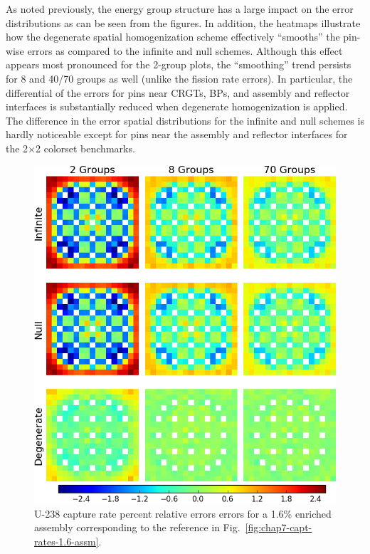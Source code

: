 As noted previously, the energy group structure has a large impact on the error distributions as can be seen from the figures. In addition, the heatmaps illustrate how the degenerate spatial homogenization scheme effectively ``smooths'' the pin-wise errors as compared to the infinite and null schemes. Although this effect appears most pronounced for the 2-group plots, the ``smoothing'' trend persists for 8 and 40/70 groups as well (unlike the fission rate errors). In particular, the differential of the errors for pins near \acp{CRGT}, \acp{BP}, and assembly and reflector interfaces is substantially reduced when degenerate homogenization is applied. The difference in the error spatial distributions for the infinite and null schemes is hardly noticeable except for pins near the assembly and reflector interfaces for the 2$\times$2 colorset benchmarks.

\begin{figure}[h!]
\centering
\includegraphics[width=\linewidth]{figures/quantification/assm-16/capt-err}
\caption[U-238 capture rate errors for a 1.6\% enriched assembly]{U-238 capture rate percent relative errors errors for a 1.6\% enriched assembly corresponding to the reference in Fig.~\ref{fig:chap7-capt-rates-1.6-assm}.}
\label{fig:chap8-assm-1.6-capt-err}
\end{figure}

